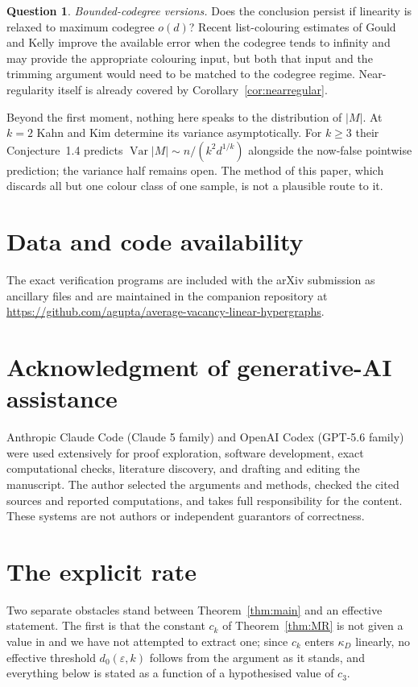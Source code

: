 \documentclass[11pt,a4paper]{amsart}
\theoremstyle{plain}
\theoremstyle{definition}
\newtheorem{question}[theorem]{Question}
\theoremstyle{remark}
\begin{document}
\begin{question}
\emph{Bounded-codegree versions.} Does the conclusion persist if linearity is relaxed to
maximum codegree $o(d)$? Recent list-colouring estimates of Gould and Kelly
\cite{GouldKelly} improve the available error when the codegree tends to infinity and may
provide the appropriate colouring input, but both that input and the trimming argument
would need to be matched to the codegree regime. Near-regularity itself is already covered
by Corollary~\ref{cor:nearregular}.
\end{question}

Beyond the first moment, nothing here speaks to the distribution of $|M|$. At $k=2$ Kahn
and Kim \cite{KahnKim98} determine its variance asymptotically. For $k\ge3$ their
Conjecture~1.4 predicts $\operatorname{Var}|M|\sim n/(k^2d^{1/k})$ alongside the now-false
pointwise prediction; the variance half remains open. The method of this paper, which
discards all but one colour class of one sample, is not a plausible route to it.

\section*{Data and code availability}
The exact verification programs are included with the arXiv submission as
ancillary files and are maintained in the companion repository at
\url{https://github.com/agupta/average-vacancy-linear-hypergraphs}.

\section*{Acknowledgment of generative-AI assistance}
Anthropic Claude Code (Claude 5 family) and OpenAI Codex (GPT-5.6 family) were
used extensively for proof exploration, software development, exact
computational checks, literature discovery, and drafting and editing the
manuscript. The author selected the arguments and methods, checked the cited
sources and reported computations, and takes full responsibility for the
content. These systems are not authors or independent guarantors of
correctness.

\appendix

\section{The explicit rate}
\label{app:rate}

Two separate obstacles stand between Theorem~\ref{thm:main} and an effective statement.
The first is that the constant $c_k$ of Theorem~\ref{thm:MR} is not given a value in
\cite{MolloyReed} and we have not attempted to extract one; since $c_k$ enters $\kappa_D$
linearly, no effective threshold $d_0(\varepsilon,k)$ follows from the argument as it
stands, and everything below is stated as a function of a hypothesised value of $c_3$.
\end{document}
